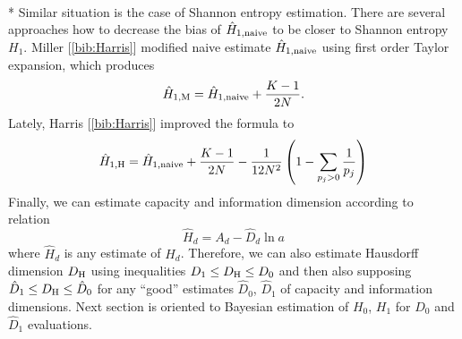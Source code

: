 \\*
Similar situation is the case of Shannon entropy estimation. There are several approaches how to decrease the bias of $\hat{H}_{1,\mbox{\scriptsize{naive}}}$ to be closer to Shannon entropy $H_{1}$. Miller [\ref{bib:Harris}] modified naive estimate $\hat{H}_{1,\mbox{\scriptsize{naive}}}$ using first order Taylor expansion, which produces
\begin{equation}
\label{eq:miller}
\hat{H}_{1,\mbox{\scriptsize{M}}}=\hat{H}_{1,\mbox{\scriptsize{naive}}} + \frac{K-1}{2N}.
\end{equation}
Lately, Harris [\ref{bib:Harris}] improved the formula to
\begin{equation}
\label{eq:harris1h}
\hat{H}_{1,\mbox{\scriptsize{H}}}=\hat{H}_{1,\mbox{\scriptsize{naive}}} + \frac{K-1}{2N} - \frac{1}{12N^2} \left( 1 - \sum_{p_{j}>0}\frac{1}{p_{j}} \right)
\end{equation}
Finally, we can estimate capacity and information dimension according to relation
\begin{equation} 
\label{eq:hjednaest}
\hat{H}_{d}=A_{d} - \hat{D}_{d} \ln{a}
\end{equation} 
where $\hat{H}_{d}$ is any estimate of $H_{d}$. Therefore, we can also estimate Hausdorff dimension $D_{\mbox{\scriptsize{H}}}$ using inequalities $D_{1} \le D_{\mbox{\scriptsize{H}}} \le D_{0}$ and then also supposing $\hat{D}_{1} \le D_{\mbox{\scriptsize{H}}} \le \hat{D}_{0}$ for any ``good'' estimates $\hat{D}_{0}$, $\hat{D}_{1}$ of capacity and information dimensions. Next section is oriented to Bayesian estimation of $H_{0}$, $H_{1}$ for $\hat{D}_{0}$ and $\hat{D}_{1}$ evaluations.